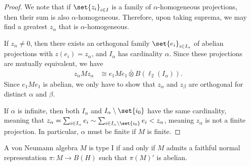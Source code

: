 \documentclass[10pt]{mypackage}
\begin{document}
\begin{proof}
  We note that if $\set{z_i}_{i\in I}$ is a family of $\alpha$-homogeneous projections, then their sum is also $\alpha$-homogeneous. Therefore, upon taking suprema, we may find a greatest $z_{\alpha}$ that is $\alpha$-homogeneous.

  If $z_{\alpha}\neq 0$, then there exists an orthogonal family $\set{e_i}_{i\in I_{\alpha}}$ of abelian projections with $z\left( e_i \right) = z_{\alpha}$, and $I_{\alpha}$ has cardinality $\alpha$. Since these projections are mutually equivalent, we have
  \begin{align*}
    z_{\alpha}Mz_{\alpha} &\cong e_{1}Me_1\bar\otimes B\left( \ell_2\left( I_{\alpha} \right) \right).
  \end{align*}
  Since $e_1Me_1$ is abelian, we only have to show that $z_{\alpha}$ and $z_{\beta}$ are orthogonal for distinct $\alpha$ and $\beta$.

  If $\alpha$ is infinite, then both $I_{\alpha}$ and $I_{\alpha}\setminus \set{i_0}$ have the same cardinality, meaning that $z_{\alpha} = \sum_{i\in I_{\alpha}}e_i\sim \sum_{i\in I_{\alpha}\setminus \set{i_0}}e_i < z_{\alpha}$, meaning $z_{\alpha}$ is not a finite projection. In particular, $\alpha$ must be finite if $M$ is finite.
\end{proof}
\begin{proposition}
  A von Neumann algebra $M$ is type I if and only if $M$ admits a faithful normal representation $\pi\colon M\rightarrow B(H)$ such that $\pi\left( M \right)'$ is abelian.
\end{proposition}
\end{document}
